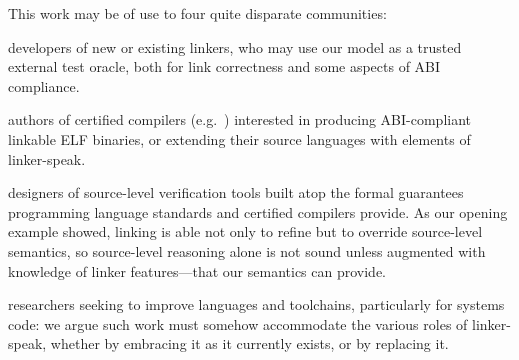 This work may be of use to four quite disparate communities:
\begin{verytightitemize}
\item developers of new or existing linkers, who may use our model as a trusted external test oracle, both for link correctness and some aspects of ABI compliance.
\item authors of certified compilers (e.g.~\cite{amadio-certified-2014, kumar-cake-2014, leroy-formal-2009, sevcik-compcert-2013}) interested in producing ABI-compliant linkable ELF binaries, or extending their source languages with elements of linker-speak. 

\item designers of source-level verification tools built atop the formal
guarantees programming language standards and certified compilers
provide. %
As our opening example showed, linking is able not only to refine but to override source-level semantics, so source-level reasoning alone is not sound unless augmented with knowledge of linker features---that our semantics can provide.

\item researchers seeking to improve languages and toolchains, particularly for systems code: we argue such work must somehow accommodate the various roles of linker-speak, whether by embracing it as it currently exists, or by replacing it.
\end{verytightitemize}
